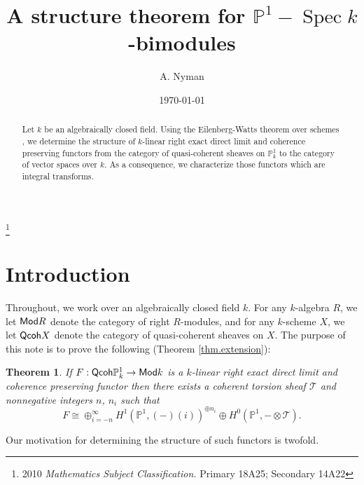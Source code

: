 \documentclass[10pt]{amsart}
\newtheorem*{introthm}{Theorem}
\theoremstyle{definition}
\theoremstyle{remark}
\numberwithin{equation}{section}
\begin{document}
\title{A structure theorem for $\mathbb{P}^{1}-\operatorname{Spec }k$-bimodules}
\author{A. Nyman}
\address{Department of Mathematics, 516 High St, Western Washington University, Bellingham, WA 98225-9063}
\keywords{}
\date{\today}
\thanks{2010 {\it Mathematics Subject Classification. } Primary 18A25; Secondary 14A22}

\maketitle

\begin{abstract}
Let $k$ be an algebraically closed field.  Using the Eilenberg-Watts theorem over schemes \cite{N}, we determine the structure of $k$-linear right exact direct limit and coherence preserving functors from the category of quasi-coherent sheaves on $\mathbb{P}_{k}^{1}$ to the category of vector spaces over $k$.  As a consequence, we characterize those functors which are integral transforms.
\end{abstract}


\section{Introduction}
Throughout, we work over an algebraically closed field $k$.  For any $k$-algebra $R$, we let ${\sf Mod }R$ denote the category of right $R$-modules, and for any $k$-scheme $X$, we let ${\sf Qcoh }X$ denote the category of quasi-coherent sheaves on $X$.  The purpose of this note is to prove the following (Theorem \ref{thm.extension}):
\begin{introthm}
If $F:{\sf Qcoh }\mathbb{P}^{1}_{k} \rightarrow {\sf Mod }k$ is a $k$-linear right exact direct limit and coherence preserving functor then there exists a coherent torsion sheaf $\mathcal{T}$ and nonnegative integers $n$, $n_{i}$ such that
$$
F \cong \oplus_{i=-n}^\infty {H}^{1}(\mathbb{P}^{1},(-)(i))^{\oplus n_{i}} \oplus H^{0}(\mathbb{P}^{1},-\otimes \mathcal{T}).
$$
\end{introthm}
Our motivation for determining the structure of such functors is twofold.
\end{document}
